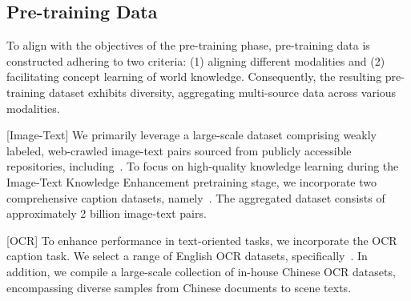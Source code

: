 \subsection{Pre-training Data}\label{subsubsec:app_pre_training_data}
To align with the objectives of the pre-training phase, pre-training data is constructed adhering to two criteria: (1) aligning different modalities and (2) facilitating concept learning of world knowledge. Consequently, the resulting pre-training dataset exhibits diversity, aggregating multi-source data across various modalities.


[Image-Text] We primarily leverage a large-scale dataset comprising weakly labeled, web-crawled image-text pairs sourced from publicly accessible repositories, including~\cite{schuhmann2022laion,sharma2018conceptual,changpinyo2021conceptual,xiezero,byeon2022coyo,gadre2024datacomp}. To focus on high-quality knowledge learning during the Image-Text Knowledge Enhancement pretraining stage, we incorporate two comprehensive caption datasets, namely~\cite{li2024densefusion,deitke2024molmo}. The aggregated dataset consists of approximately 2 billion image-text pairs.



[OCR] To enhance performance in text-oriented tasks, we incorporate the OCR caption task. We select a range of English OCR datasets, specifically~\cite{soboroff2022complex,biten2022ocr,kim2023web,weber2023wordscape,chen2024textdiffuser}. In addition, we compile a large-scale collection of in-house Chinese OCR datasets, encompassing diverse samples from Chinese documents to scene texts.


